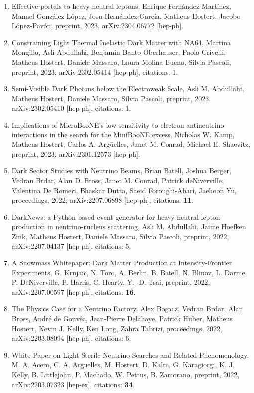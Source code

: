\documentclass[a4paper,10pt]{article}
\begin{document}
\begin{enumerate} 
\item Effective portals to heavy neutral leptons, Enrique Fernández-Martínez, Manuel González-López, Josu Hernández-García, Matheus Hostert, Jacobo López-Pavón, preprint, 2023, arXiv:2304.06772 [hep-ph].
\item Constraining Light Thermal Inelastic Dark Matter with NA64, Martina Mongillo, Asli Abdullahi, Benjamin Banto Oberhauser, Paolo Crivelli, Matheus Hostert, Daniele Massaro, Laura Molina Bueno, Silvia Pascoli, preprint, 2023, arXiv:2302.05414 [hep-ph], citations: 1.
\item Semi-Visible Dark Photons below the Electroweak Scale, Asli M. Abdullahi, Matheus Hostert, Daniele Massaro, Silvia Pascoli, preprint, 2023, arXiv:2302.05410 [hep-ph], citations: 1.
\item Implications of MicroBooNE's low sensitivity to electron antineutrino interactions in the search for the MiniBooNE excess, Nicholas W. Kamp, Matheus Hostert, Carlos A. Argüelles, Janet M. Conrad, Michael H. Shaevitz, preprint, 2023, arXiv:2301.12573 [hep-ph].
\item Dark Sector Studies with Neutrino Beams, Brian Batell, Joshua Berger, Vedran Brdar, Alan D. Bross, Janet M. Conrad, Patrick deNiverville, Valentina De Romeri, Bhaskar Dutta, Saeid Foroughi-Abari, Jaehoon Yu, proceedings, 2022, arXiv:2207.06898 [hep-ph], citations: \textbf{11}.
\item DarkNews: a Python-based event generator for heavy neutral lepton production in neutrino-nucleus scattering, Asli M. Abdullahi, Jaime Hoefken Zink, Matheus Hostert, Daniele Massaro, Silvia Pascoli, preprint, 2022, arXiv:2207.04137 [hep-ph], citations: 5.
\item A Snowmass Whitepaper: Dark Matter Production at Intensity-Frontier Experiments, G. Krnjaic, N. Toro, A. Berlin, B. Batell, N. Blinov, L. Darme, P. DeNiverville, P. Harris, C. Hearty, Y. -D. Tsai, preprint, 2022, arXiv:2207.00597 [hep-ph], citations: \textbf{16}.
\item The Physics Case for a Neutrino Factory, Alex Bogacz, Vedran Brdar, Alan Bross, André de Gouvêa, Jean-Pierre Delahaye, Patrick Huber, Matheus Hostert, Kevin J. Kelly, Ken Long, Zahra Tabrizi, proceedings, 2022, arXiv:2203.08094 [hep-ph], citations: 6.
\item White Paper on Light Sterile Neutrino Searches and Related Phenomenology, M. A. Acero, C. A. Argüelles, M. Hostert, D. Kalra, G. Karagiorgi, K. J. Kelly, B. Littlejohn, P. Machado, W. Pettus, B. Zamorano, preprint, 2022, arXiv:2203.07323 [hep-ex], citations: \textbf{34}.

\end{enumerate}
\end{document}
